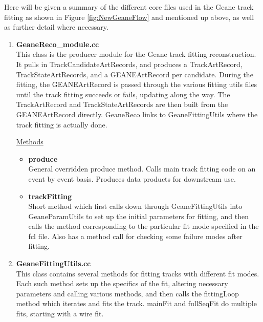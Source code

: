    Here will be given a summary of the different core files used in the Geane track fitting as shown in Figure \ref{fig:NewGeaneFlow} and mentioned up above, as well as further detail where necessary. 


    \begin{enumerate}

      \item{\bf{GeaneReco\_module.cc}} \\
      This class is the producer module for the Geane track fitting reconstruction. It pulls in TrackCandidateArtRecords, and produces a TrackArtRecord, TrackStateArtRecords, and a GEANEArtRecord per candidate. During the fitting, the GEANEArtRecord is passed through the various fitting utils files until the track fitting succeeds or fails, updating along the way. The TrackArtRecord and TrackStateArtRecords are then built from the GEANEArtRecord directly. GeaneReco links to GeaneFittingUtils where the track fitting is actually done.

      \underline{Methods}

        \begin{itemize}

          \item{\bf{produce}} \\
          General overridden produce method. Calls main track fitting code on an event by event basis. Produces data products for downstream use.

          \item{\bf{trackFitting}} \\ 
          Short method which first calls down through GeaneFittingUtils into GeaneParamUtils to set up the initial parameters for fitting, and then calls the method corresponding to the particular fit mode specified in the fcl file. Also has a method call for checking some failure modes after fitting.

        \end{itemize}

      \item{\bf{GeaneFittingUtils.cc}} \\
      \label{sec:GeaneFittingUtils}
      This class contains several methods for fitting tracks with different fit modes. Each such method sets up the specifics of the fit, altering necessary parameters and calling various methods, and then calls the fittingLoop method which iterates and fits the track. mainFit and fullSeqFit do multiple fits, starting with a wire fit. 


\end{enumerate}
